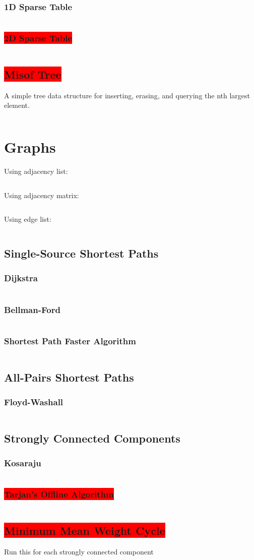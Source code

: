 \documentclass[8pt,a4paper,landscape,oneside]{amsart}
\newcommand{\code}[1]{\inputminted[fontsize=\normalsize,baselinestretch=1]{cpp}{_code/#1}}
\newcommand{\subsectionRed}[1]{\subsection{\colorbox{red}{\color{white}#1}}}
\newcommand{\subsubsectionRed}[1]{\subsubsection{\colorbox{red}{\color{white}#1}}}
\begin{document}
\begin{multicols*}{3}
    \subsubsection{1D Sparse Table}
      \code{data-structures/sparse.cpp}
    \subsubsectionRed{2D Sparse Table}
      \code{data-structures/sparse_2d.cpp}
  \subsectionRed{Misof Tree}
    A simple tree data structure for inserting, erasing, and querying the nth largest element.
    \code{data-structures/misof_tree.cpp}
\section{Graphs}
	Using adjacency list:
	\code{graphs/graph_template_adjlist.cpp}
	Using adjacency matrix:
	\code{graphs/graph_template_adjmat.cpp}
	Using edge list:
	\code{graphs/graph_template_edgelist.cpp}
	\subsection{Single-Source Shortest Paths}
		\subsubsection{Dijkstra}
			\code{graphs/shortest_paths/dijkstra.cpp}
		\subsubsection{Bellman-Ford}
			\code{graphs/shortest_paths/bellman_ford.cpp}
    \subsubsection{Shortest Path Faster Algorithm}
      \code{graphs/shortest_paths/spfa.cpp}
	\subsection{All-Pairs Shortest Paths}
		\subsubsection{Floyd-Washall}
			\code{graphs/shortest_paths/floyd_warshall.cpp}
	\subsection{Strongly Connected Components}
		\subsubsection{Kosaraju}
      \code{graphs/scc/kosaraju.cpp}
    \subsubsectionRed{Tarjan's Offline Algorithm}
      \code{graphs/scc/tarjan.cpp}
  \subsectionRed{Minimum Mean Weight Cycle}
    Run this for each strongly connected component
    \code{graphs/min_mean_cycle.cpp}

\end{multicols*}
\end{document}
